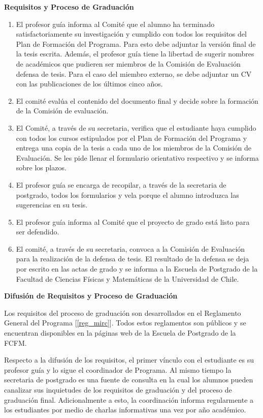 \noindent\textbf{Requisitos y Proceso de Graduación}

\begin{enumerate}
\item El profesor guía informa al Comité que el alumno ha terminado satisfactoriamente su
investigación y cumplido con todos los requisitos del Plan de Formación del Programa.
Para esto debe adjuntar la versión final de la tesis escrita. Además, el profesor guía tiene
la libertad de sugerir nombres de académicos que pudieren ser miembros de la Comisión de
Evaluación defensa de tesis. Para el caso del miembro externo, se debe adjuntar un CV con
las publicaciones de los últimos cinco años.
\item El comité evalúa el contenido del documento final y decide sobre la formación de la Comisión
de evaluación.
\item El Comité, a través de su secretaria, verifica que el estudiante haya cumplido con todos los
cursos estipulados por el Plan de Formación del Programa y entrega una copia de la tesis a
cada uno de los miembros de la Comisión de Evaluación. Se les pide llenar el formulario
orientativo respectivo y se informa sobre los plazos.
\item El profesor guía se encarga de recopilar, a través de la secretaria de postgrado, todos los
formularios y vela porque el alumno introduzca las sugerencias en su tesis.
\item El profesor guía informa al Comité que el proyecto de grado está listo para ser defendido.
\item El comité, a través de su secretaria, convoca a la Comisión de Evaluación para la realización
de la defensa de tesis. El resultado de la defensa se deja por escrito en las actas de grado y
se informa a la Escuela de Postgrado de la Facultad de Ciencias Físicas y Matemáticas de la
Universidad de Chile.
\end{enumerate}

\noindent\textbf{Difusión de Requisitos y Proceso de Graduación}

Los requisitos del proceso de graduación son desarrollados en el Reglamento General del Programa [\ref{reg_mirc}]. Todos estos
reglamentos son públicos y se encuentran disponibles en la páginas web de la Escuela de Postgrado de la FCFM.

Respecto a la difusión de los requisitos, el primer vínculo con el estudiante es su profesor guía
y lo sigue el coordinador de Programa. Al mismo tiempo la secretaria de postgrado es una fuente
de consulta en la cual los alumnos pueden canalizar sus inquietudes de los requisitos de graduación
y del proceso de graduación final. Adicionalmente a esto, la coordinación informa regularmente a
los estudiantes por medio de charlas informativas una vez por año académico.

